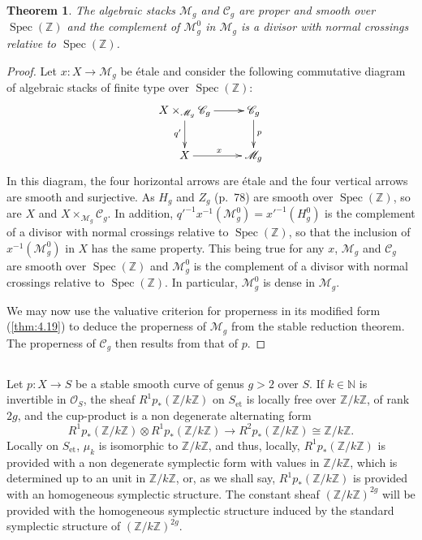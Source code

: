 \documentclass[10pt]{amsart}
\theoremstyle{plain}
\newtheorem{theorem}{Theorem}[section]
\theoremstyle{definition}
\DeclareMathOperator{\Spec}{Spec}
\DeclareMathOperator{\et}{et}
\newcommand{\cO}{\mathcal{O}}
\begin{document}
\begin{theorem}\label{thm:5.2}
The algebraic stacks $\mathscr{M}_g$ and $\mathscr{C}_g$ are proper and smooth over $\Spec(\mathbb{Z})$ and the complement of $\mathscr{M}_g^0$ in $\mathscr{M}_g$ is a divisor with normal crossings relative to $\Spec(\mathbb{Z})$.
\end{theorem}

\begin{proof}
Let $x: X \to \mathscr{M}_g$ be \'etale and consider the following commutative diagram of algebraic stacks of finite type over $\Spec(\mathbb{Z})$:
\[
\xymatrix{
X \times_{\mathscr{M}_g} \mathscr{C}_g \ar[r] \ar[d]_{q'} & \mathscr{C}_g \ar[d]^p \\
X \ar[r]^x & \mathscr{M}_g
}
\]
In this diagram, the four horizontal arrows are \'etale and the four vertical arrows are smooth and surjective. As $H_g$ and $Z_g$ (p.~78) are smooth over $\Spec(\mathbb{Z})$, so are $X$ and $X \times_{\mathscr{M}_g} \mathscr{C}_g$. In addition, $q'^{-1} x^{-1}(\mathscr{M}_g^0) = x'^{-1}(H_g^0)$ is the complement of a divisor with normal crossings relative to $\Spec(\mathbb{Z})$, so that the inclusion of $x^{-1}(\mathscr{M}_g^0)$ in $X$ has the same property. This being true for any $x$, $\mathscr{M}_g$ and $\mathscr{C}_g$ are smooth over $\Spec(\mathbb{Z})$ and $\mathscr{M}_g^0$ is the complement of a divisor with normal crossings relative to $\Spec(\mathbb{Z})$. In particular, $\mathscr{M}_g^0$ is dense in $\mathscr{M}_g$.

We may now use the valuative criterion for properness in its modified form (\ref{thm:4.19}) to deduce the properness of $\mathscr{M}_g$ from the stable reduction theorem. The properness of $\mathscr{C}_g$ then results from that of $p$.
\end{proof}

\subsection*{}

Let $p: X \to S$ be a stable smooth curve of genus $g > 2$ over $S$. If $k \in \mathbb{N}$ is invertible in $\cO_S$, the sheaf $R^1 p_*(\mathbb{Z}/k\mathbb{Z})$ on $S_{\et}$ is locally free over $\mathbb{Z}/k\mathbb{Z}$, of rank $2g$, and the cup-product is a non degenerate alternating form
\[
R^1 p_*(\mathbb{Z}/k\mathbb{Z}) \otimes R^1 p_*(\mathbb{Z}/k\mathbb{Z}) \longrightarrow R^2 p_*(\mathbb{Z}/k\mathbb{Z}) \cong \mathbb{Z}/k\mathbb{Z}.
\]
Locally on $S_{\et}$, $\mu_k$ is isomorphic to $\mathbb{Z}/k\mathbb{Z}$, and thus, locally, $R^1 p_*(\mathbb{Z}/k\mathbb{Z})$ is provided with a non degenerate symplectic form with values in $\mathbb{Z}/k\mathbb{Z}$, which is determined up to an unit in $\mathbb{Z}/k\mathbb{Z}$, or, as we shall say, $R^1 p_*(\mathbb{Z}/k\mathbb{Z})$ is provided with an homogeneous symplectic structure. The constant sheaf $(\mathbb{Z}/k\mathbb{Z})^{2g}$ will be provided with the homogeneous symplectic structure induced by the standard symplectic structure of $(\mathbb{Z}/k\mathbb{Z})^{2g}$.
\end{document}
